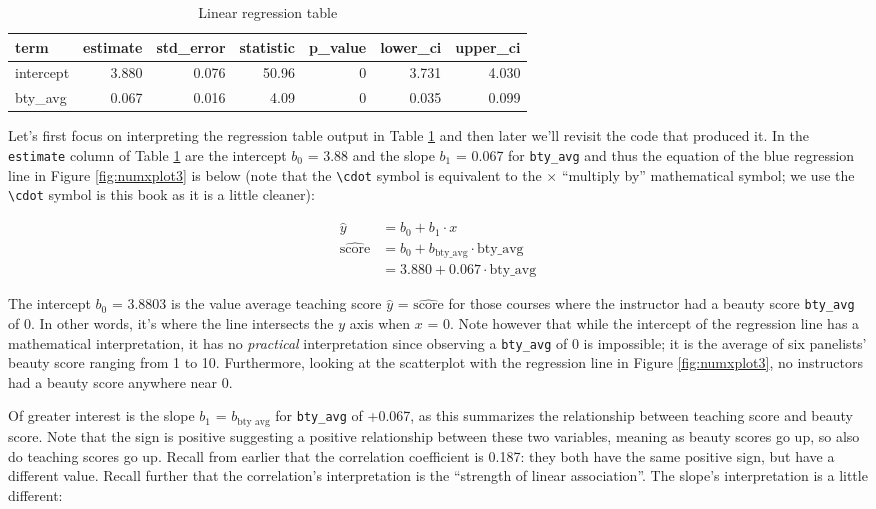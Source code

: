 \documentclass[12pt, krantz2,]{krantz}
\begin{document}
\begin{table}[H]

\caption{\label{tab:regtable}Linear regression table}
\centering
\fontsize{10}{12}\selectfont
\begin{tabular}{lrrrrrr}
\toprule
term & estimate & std\_error & statistic & p\_value & lower\_ci & upper\_ci\\
\midrule
intercept & 3.880 & 0.076 & 50.96 & 0 & 3.731 & 4.030\\
bty\_avg & 0.067 & 0.016 & 4.09 & 0 & 0.035 & 0.099\\
\bottomrule
\end{tabular}
\end{table}

Let's first focus on interpreting the regression table output in Table \ref{tab:regtable} and then later we'll revisit the code that produced it. In the \texttt{estimate} column of Table \ref{tab:regtable} are the intercept \(b_0\) = 3.88 and the slope \(b_1\) = 0.067 for \texttt{bty\_avg} and thus the equation of the blue regression line in Figure \ref{fig:numxplot3} is below (note that the \texttt{\textbackslash{}cdot} symbol is equivalent to the \(\times\) ``multiply by'' mathematical symbol; we use the \texttt{\textbackslash{}cdot} symbol is this book as it is a little cleaner):

\[
\begin{aligned}
\widehat{y} &= b_0 + b_1 \cdot x\\
\widehat{\text{score}} &= b_0 + b_{\text{bty}\_\text{avg}} \cdot\text{bty}\_\text{avg}\\
&= 3.880 + 0.067\cdot\text{bty}\_\text{avg}
\end{aligned}
\]

The intercept \(b_0\) = 3.8803 is the value average teaching score \(\widehat{y}\) = \(\widehat{\text{score}}\) for those courses where the instructor had a beauty score \texttt{bty\_avg} of 0. In other words, it's where the line intersects the \(y\) axis when \(x\) = 0. Note however that while the intercept of the regression line has a mathematical interpretation, it has no \emph{practical} interpretation since observing a \texttt{bty\_avg} of 0 is impossible; it is the average of six panelists' beauty score ranging from 1 to 10. Furthermore, looking at the scatterplot with the regression line in Figure \ref{fig:numxplot3}, no instructors had a beauty score anywhere near 0.

Of greater interest is the slope \(b_1\) = \(b_{\text{bty avg}}\) for \texttt{bty\_avg} of +0.067, as this summarizes the relationship between teaching score and beauty score. Note that the sign is positive suggesting a positive relationship between these two variables, meaning as beauty scores go up, so also do teaching scores go up. Recall from earlier that the correlation coefficient is 0.187: they both have the same positive sign, but have a different value. Recall further that the correlation's interpretation is the ``strength of linear association''. The slope's interpretation is a little different:
\end{document}

